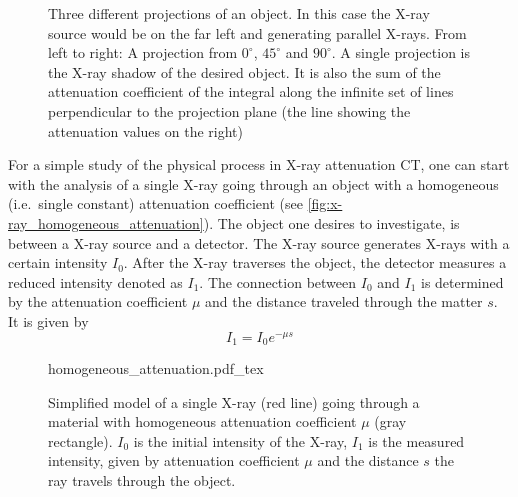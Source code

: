 \begin{figure}
	\centering
	\caption{Three different projections of an object. In this case the X-ray source would be on
		the far left and generating parallel X-rays. From left to right: A projection from
		\(0^\circ\), \(45^\circ\) and \(90^\circ\). A single projection is the X-ray shadow
		of the desired object. It is also the sum of the attenuation coefficient of the
		integral along the infinite set of lines perpendicular to the projection plane (the
		line showing the attenuation values on the right)}\label{fig:sinogram_example_abdomen}
\end{figure}

For a simple study of the physical process in X-ray attenuation CT, one can start with the analysis
of a single X-ray going through an object with a homogeneous (i.e.\ single constant) attenuation
coefficient (see \autoref{fig:x-ray_homogeneous_attenuation}). The object one desires to
investigate, is between a X-ray source and a detector. The X-ray source generates X-rays with a
certain intensity \(I_0\). After the X-ray traverses the object, the detector measures a reduced
intensity denoted as \(I_1\). The connection between \(I_0\) and \(I_1\) is determined by the
attenuation coefficient \(\mu\) and the distance traveled through the matter \(s\). It is given by
\[ I_1 = I_0 e^{-\mu s} \]

\begin{figure}
	\centering
	\def\svgwidth{0.75\textwidth}
	{homogeneous_attenuation.pdf_tex}
	\caption{Simplified model of a single X-ray (red line) going through a material with
		homogeneous attenuation coefficient \(\mu\) (gray rectangle). \(I_0\) is the initial
		intensity of the X-ray, \(I_1\) is the measured intensity, given by attenuation
		coefficient \(\mu\) and the distance \(s\) the ray travels through the
		object.}\label{fig:x-ray_homogeneous_attenuation}
\end{figure}

